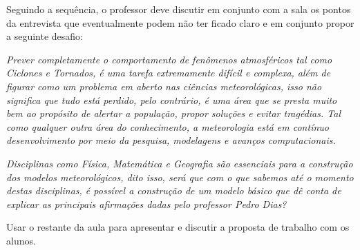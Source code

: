 Seguindo a sequência, o professor deve discutir em conjunto com a sala os pontos da entrevista que eventualmente podem não ter ficado claro e em conjunto propor a seguinte desafio:

\emph{Prever completamente o comportamento de fenômenos atmosféricos tal como Ciclones e Tornados, é uma tarefa extremamente difícil e complexa, além de figurar como um problema em aberto nas ciências meteorológicas, isso não significa que tudo está perdido, pelo contrário, é uma área que se presta muito bem ao propósito de alertar a população, propor soluções e evitar tragédias. Tal como qualquer outra área do conhecimento, a meteorologia está em contínuo desenvolvimento por meio da pesquisa, modelagens e avanços computacionais.}

\emph{Disciplinas como Física, Matemática e Geografia são essenciais para a construção dos modelos meteorológicos, dito isso, será que com o que sabemos até o momento destas disciplinas, é possível a construção de um modelo básico que dê conta de explicar as principais afirmações dadas pelo professor Pedro Dias?}

Usar o restante da aula para apresentar e discutir a proposta de trabalho com os alunos.
